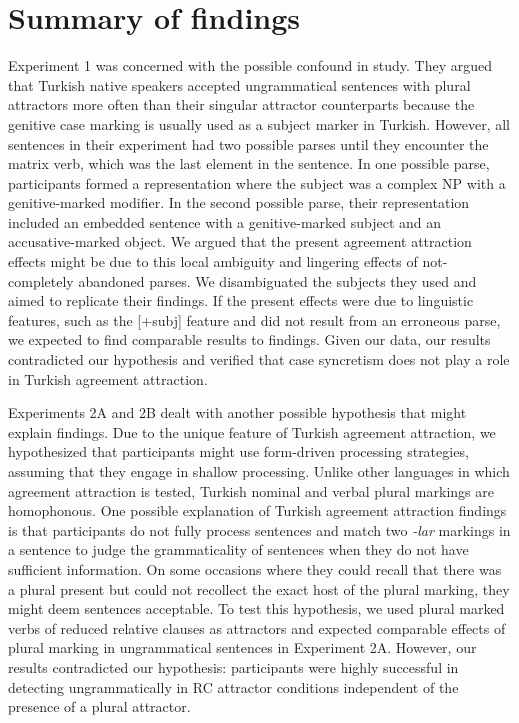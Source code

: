 \section{Summary of findings} \label{ch6summary}
Experiment 1 was concerned with the possible confound in \cites{LagoEtAl2019} study. They argued that Turkish native speakers accepted ungrammatical sentences with plural attractors more often than their singular attractor counterparts because the genitive case marking is usually used as a subject marker in Turkish. However, all sentences in their experiment had two possible parses until they encounter the matrix verb, which was the last element in the sentence. In one possible parse, participants formed a representation where the subject was a complex NP with a genitive-marked modifier. In the second possible parse, their representation included an embedded sentence with a genitive-marked subject and an accusative-marked object. We argued that the present agreement attraction effects might be due to this local ambiguity and lingering effects of not-completely abandoned parses. We disambiguated the subjects they used and aimed to replicate their findings. If the present effects were due to linguistic features, such as the [+{subj}] feature and did not result from an erroneous parse, we expected to find comparable results to \cites{LagoEtAl2019} findings. Given our data, our results contradicted our hypothesis and verified that case syncretism does not play a role in Turkish agreement attraction. 

Experiments 2A and 2B dealt with another possible hypothesis that might explain \cites{LagoEtAl2019} findings. Due to the unique feature of Turkish agreement attraction, we hypothesized that participants might use form-driven processing strategies, assuming that they engage in shallow processing. Unlike other languages in which agreement attraction is tested, Turkish nominal and verbal plural markings are homophonous. One possible explanation of Turkish agreement attraction findings is that participants do not fully process sentences and match two \emph{-lar} markings in a sentence to judge the grammaticality of sentences when they do not have sufficient information. On some occasions where they could recall that there was a plural present but could not recollect the exact host of the plural marking, they might deem sentences acceptable. To test this hypothesis, we used plural marked verbs of reduced relative clauses as attractors and expected comparable effects of plural marking in ungrammatical sentences in Experiment 2A. However, our results contradicted our hypothesis: participants were highly successful in detecting ungrammatically in RC attractor conditions independent of the presence of a plural attractor. 


